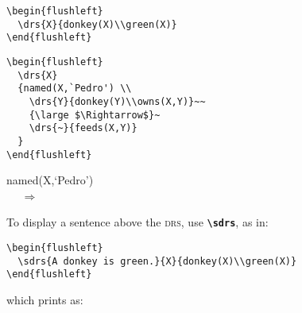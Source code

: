 \documentclass[english]{article}
\newcommand*\jmacro[1]{\textbf{\texttt{#1}}}
\newcommand*\jcsmacro[1]{\jmacro{\textbackslash{#1}}}
\begin{document}
\begin{minipage}{.5\textwidth}
\begin{lstlisting}[moretexcs={drs}]
\begin{flushleft}
  \drs{X}{donkey(X)\\green(X)}
\end{flushleft}
\end{lstlisting}
\end{minipage}\hfill
\begin{minipage}{.4\textwidth}
\begin{flushleft}
\end{flushleft}
\end{minipage}

\medskip

\begin{minipage}{.5\textwidth}
\begin{lstlisting}[moretexcs={drs}]
\begin{flushleft}
  \drs{X}
  {named(X,`Pedro') \\
    \drs{Y}{donkey(Y)\\owns(X,Y)}~~
    {\large $\Rightarrow$}~
    \drs{~}{feeds(X,Y)}
  }
\end{flushleft}
\end{lstlisting}
\end{minipage}\hfill
\begin{minipage}{.4\textwidth}
	\begin{flushleft}
		{named(X,`Pedro') \\
			~~
			{\large $\Rightarrow$}~
		}
	\end{flushleft}
\end{minipage}

\medskip

\noindent To display a sentence above the \textsc{drs}, use \jcsmacro{sdrs}, as in:

\begin{lstlisting}[moretexcs={sdrs}]
\begin{flushleft}
  \sdrs{A donkey is green.}{X}{donkey(X)\\green(X)}
\end{flushleft}
\end{lstlisting}
which prints as:

\begin{flushleft}
\end{flushleft}
\end{document}
